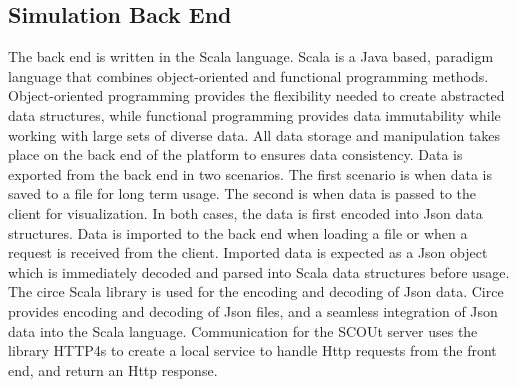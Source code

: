 \subsection{Simulation Back End}
The back end is written in the Scala language.
Scala is a Java based, paradigm language that combines object-oriented and functional programming methods.
Object-oriented programming provides the flexibility needed to create abstracted data structures, while functional programming provides data immutability while working with large sets of diverse data.
All data storage and manipulation takes place on the back end of the platform to ensures data consistency.
Data is exported from the back end in two scenarios.
The first scenario is when data is saved to a file for long term usage.
The second is when data is passed to the client for visualization.
In both cases, the data is first encoded into Json data structures.
Data is imported to the back end when loading a file or when a request is received from the client.
Imported data is expected as a Json object which is immediately decoded and parsed into Scala data structures before usage.
The circe Scala library  is used for the encoding and decoding of Json data.
Circe provides encoding and decoding of Json files, and a seamless integration of Json data into the Scala language.
Communication for the SCOUt server uses the library HTTP4s  to create a local service to handle Http requests from the front end, and return an Http response.


